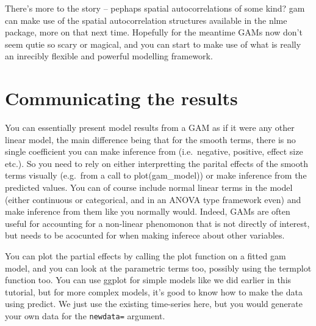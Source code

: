 \documentclass[]{book}
\newenvironment{Shaded}{\begin{snugshade}}{\end{snugshade}}
\newcommand{\DataTypeTok}[1]{\textcolor[rgb]{0.13,0.29,0.53}{#1}}
\newcommand{\DecValTok}[1]{\textcolor[rgb]{0.00,0.00,0.81}{#1}}
\newcommand{\FloatTok}[1]{\textcolor[rgb]{0.00,0.00,0.81}{#1}}
\newcommand{\KeywordTok}[1]{\textcolor[rgb]{0.13,0.29,0.53}{\textbf{#1}}}
\newcommand{\NormalTok}[1]{#1}
\newcommand{\OperatorTok}[1]{\textcolor[rgb]{0.81,0.36,0.00}{\textbf{#1}}}
\newcommand{\StringTok}[1]{\textcolor[rgb]{0.31,0.60,0.02}{#1}}
\begin{document}
There's more to the story -- pephaps spatial autocorrelations of some kind? gam can make use of the spatial autocorrelation structures available in the nlme package, more on that next time. Hopefully for the meantime GAMs now don't seem qutie so scary or magical, and you can start to make use of what is really an inrecibly flexible and powerful modelling framework.

\hypertarget{communicating-the-results}{%
\section{Communicating the results}\label{communicating-the-results}}

You can essentially present model results from a GAM as if it were any other linear model, the main difference being that for the smooth terms, there is no single coefficient you can make inference from (i.e.~negative, positive, effect size etc.). So you need to rely on either interpretting the parital effects of the smooth terms visually (e.g.~from a call to plot(gam\_model)) or make inference from the predicted values. You can of course include normal linear terms in the model (either continuous or categorical, and in an ANOVA type framework even) and make inference from them like you normally would. Indeed, GAMs are often useful for accounting for a non-linear phenomonon that is not directly of interest, but needs to be acocunted for when making inferece about other variables.

You can plot the partial effects by calling the plot function on a fitted gam model, and you can look at the parametric terms too, possibly using the termplot function too. You can use ggplot for simple models like we did earlier in this tutorial, but for more complex models, it's good to know how to make the data using predict. We just use the existing time-series here, but you would generate your own data for the \texttt{newdata=} argument.

\begin{Shaded}
\end{Shaded}
\end{document}

